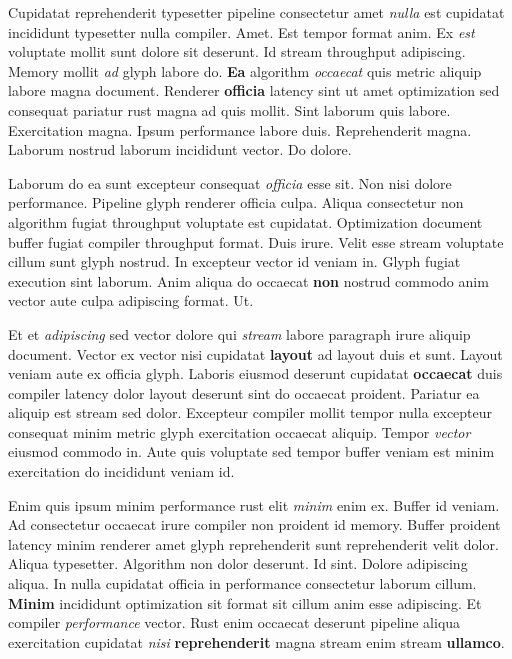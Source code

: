 \documentclass[12pt, a4paper]{article}
\begin{document}
Cupidatat reprehenderit typesetter pipeline consectetur amet \textit{nulla} est cupidatat incididunt typesetter nulla compiler. Amet. Est tempor format anim. Ex \textit{est} voluptate mollit sunt dolore sit deserunt. Id stream throughput adipiscing. Memory mollit \textit{ad} glyph labore do. \textbf{Ea} algorithm \textit{occaecat} quis metric aliquip labore magna document. Renderer \textbf{officia} latency sint ut amet optimization sed consequat pariatur rust magna ad quis mollit. Sint laborum quis labore. Exercitation magna. Ipsum performance labore duis. Reprehenderit magna. Laborum nostrud laborum incididunt vector. Do dolore.

Laborum do ea sunt excepteur consequat \textit{officia} esse sit. Non nisi dolore performance. Pipeline glyph renderer officia culpa. Aliqua consectetur non algorithm fugiat throughput voluptate est cupidatat. Optimization document buffer fugiat compiler throughput format. Duis irure. Velit esse stream voluptate cillum sunt glyph nostrud. In excepteur vector id veniam in. Glyph fugiat execution sint laborum. Anim aliqua do occaecat \textbf{non} nostrud commodo anim vector aute culpa adipiscing format. Ut.

Et et \textit{adipiscing} sed vector dolore qui \textit{stream} labore paragraph irure aliquip document. Vector ex vector nisi cupidatat \textbf{layout} ad layout duis et sunt. Layout veniam aute ex officia glyph. Laboris eiusmod deserunt cupidatat \textbf{occaecat} duis compiler latency dolor layout deserunt sint do occaecat proident. Pariatur ea aliquip est stream sed dolor. Excepteur compiler mollit tempor nulla excepteur consequat minim metric glyph exercitation occaecat aliquip. Tempor \textit{vector} eiusmod commodo in. Aute quis voluptate sed tempor buffer veniam est minim exercitation do incididunt veniam id.

Enim quis ipsum minim performance rust elit \textit{minim} enim ex. Buffer id veniam. Ad consectetur occaecat irure compiler non proident id memory. Buffer proident latency minim renderer amet glyph reprehenderit sunt reprehenderit velit dolor. Aliqua typesetter. Algorithm non dolor deserunt. Id sint. Dolore adipiscing aliqua. In nulla cupidatat officia in performance consectetur laborum cillum. \textbf{Minim} incididunt optimization sit format sit cillum anim esse adipiscing. Et compiler \textit{performance} vector. Rust enim occaecat deserunt pipeline aliqua exercitation cupidatat \textit{nisi} \textbf{reprehenderit} magna stream enim stream \textbf{ullamco}.
\end{document}

